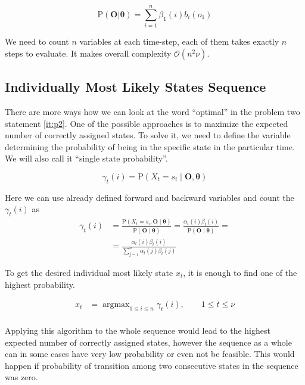 \documentclass[thesis=M,english]{FITthesis}[2012/10/20]
\newcommand{\matr}[1]{\mathbf{#1}}
\newcommand{\argmax}{\mathop{\mathrm{argmax}}}
\begin{document}
\begin{equation}
\mathrm{P}(\matr{O}|\boldsymbol{\theta}) = \sum_{i=1}^n \beta_{1}(i) b_i(o_1)
\end{equation} 


We need to count $n$ variables at each time-step, each of them takes exactly $n$ steps to evaluate. It makes overall complexity $\mathcal{O}(n^2\nu)$.    

\subsection{Individually Most Likely States Sequence}\label{sec:ssp}
There are more ways how we can look at the word ``optimal'' in the problem two statement \ref{it:p2}. One of the possible approaches is to maximize the expected number of correctly assigned states. To solve it, we need to define the variable determining the probability of being in the specific state in the particular time. We will also call it ``single state probability''.

\begin{equation}
\gamma_t(i) = \mathrm{P}(X_t = s_i \mid \matr{O},\boldsymbol{\theta} ) 
\end{equation}

Here we can use already defined forward and backward variables and count the $\gamma_t(i)$ as
\begin{equation}
\begin{aligned}
\gamma_t(i) &= \frac{ \mathrm{P}( X_t = s_i, \matr{O} \mid \boldsymbol{\theta} )}{ \mathrm{P}( \matr{O} \mid \boldsymbol{\theta} )} =
               \frac{  \alpha_t(i) \beta_t(i) }{ \mathrm{P}( \matr{O} \mid \boldsymbol{\theta} )} = \\
            &= \frac{  \alpha_t(i) \beta_t(i) }{ \sum\limits_{j=1}^n \alpha_t(j) \beta_t(j) } 
\end{aligned}
\end{equation}

To get the desired individual most likely state $x_t$, it is enough to find one of the highest probability.

\begin{equation}
\begin{aligned}
x_t &= \argmax_{1 \leq i \leq n} \gamma_t(i), \qquad 1 \leq t \leq \nu \\
\end{aligned}
\end{equation} 

Applying this algorithm to the whole sequence would lead to the highest expected number of correctly assigned states, however the sequence as a whole can in some cases have very low probability or even not be feasible. This would happen if probability of transition among two consecutive states in the sequence was zero.   
   
\end{document}
